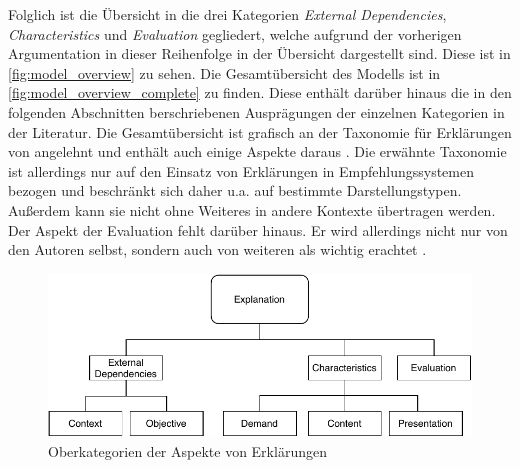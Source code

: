 \smallbreak

Folglich ist die Übersicht in die drei Kategorien \textit{External Dependencies}, \textit{Characteristics} und \textit{Evaluation} gegliedert, welche aufgrund der vorherigen Argumentation in dieser Reihenfolge in der Übersicht dargestellt sind. Diese ist in \autoref{fig:model_overview} zu sehen. Die Gesamtübersicht des Modells ist in \autoref{fig:model_overview_complete} zu finden. Diese enthält darüber hinaus die in den folgenden Abschnitten berschriebenen Ausprägungen der einzelnen Kategorien in der Literatur. Die Gesamtübersicht ist grafisch an der Taxonomie für Erklärungen von \citeauthor{nunes_systematic_2017} angelehnt und enthält auch einige Aspekte daraus \cite{nunes_systematic_2017}. Die erwähnte Taxonomie ist allerdings nur auf den Einsatz von Erklärungen in Empfehlungssystemen bezogen und beschränkt sich daher u.a. auf bestimmte Darstellungstypen. Außerdem kann sie nicht ohne Weiteres in andere Kontexte übertragen werden. Der Aspekt der Evaluation fehlt darüber hinaus. Er wird allerdings nicht nur von den Autoren selbst, sondern auch von weiteren als wichtig erachtet \cite{cirqueira_scenario-based_2020, martin_evaluating_2021}.

\begin{figure}[htb!]
    \begin{center}
        \includegraphics[width=0.9\linewidth]{contents/05_model_description/res/model-overview.pdf}
    \end{center}
    \caption{Oberkategorien der Aspekte von Erklärungen}
    \label{fig:model_overview}
\end{figure}